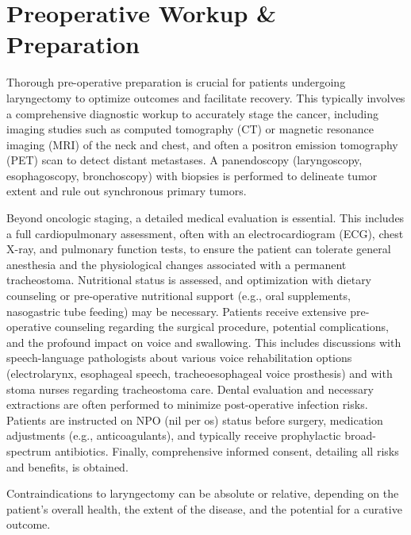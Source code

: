 \section*{Preoperative Workup \& Preparation}
Thorough pre-operative preparation is crucial for patients undergoing laryngectomy to optimize outcomes and facilitate recovery. This typically involves a comprehensive diagnostic workup to accurately stage the cancer, including imaging studies such as computed tomography (CT) or magnetic resonance imaging (MRI) of the neck and chest, and often a positron emission tomography (PET) scan to detect distant metastases. A panendoscopy (laryngoscopy, esophagoscopy, bronchoscopy) with biopsies is performed to delineate tumor extent and rule out synchronous primary tumors.

Beyond oncologic staging, a detailed medical evaluation is essential. This includes a full cardiopulmonary assessment, often with an electrocardiogram (ECG), chest X-ray, and pulmonary function tests, to ensure the patient can tolerate general anesthesia and the physiological changes associated with a permanent tracheostoma. Nutritional status is assessed, and optimization with dietary counseling or pre-operative nutritional support (e.g., oral supplements, nasogastric tube feeding) may be necessary. Patients receive extensive pre-operative counseling regarding the surgical procedure, potential complications, and the profound impact on voice and swallowing. This includes discussions with speech-language pathologists about various voice rehabilitation options (electrolarynx, esophageal speech, tracheoesophageal voice prosthesis) and with stoma nurses regarding tracheostoma care. Dental evaluation and necessary extractions are often performed to minimize post-operative infection risks. Patients are instructed on NPO (nil per os) status before surgery, medication adjustments (e.g., anticoagulants), and typically receive prophylactic broad-spectrum antibiotics. Finally, comprehensive informed consent, detailing all risks and benefits, is obtained.

Contraindications to laryngectomy can be absolute or relative, depending on the patient's overall health, the extent of the disease, and the potential for a curative outcome.

